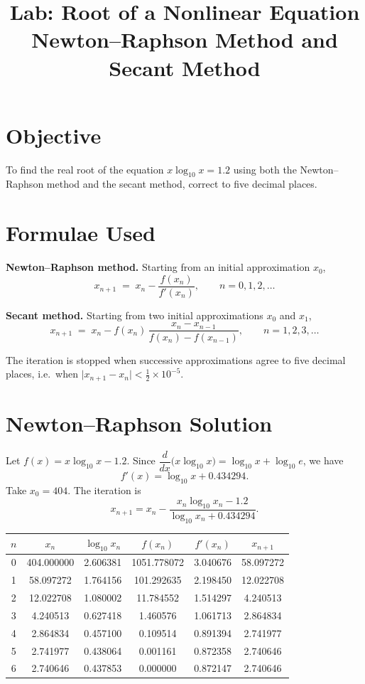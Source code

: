 \documentclass[11pt,a4paper]{article}
\title{\textbf{Lab: Root of a Nonlinear Equation}\\[4pt]
\large Newton--Raphson Method and Secant Method}
\author{}
\date{}
\begin{document}
\maketitle
\vspace{-3em}

\section*{Objective}
To find the real root of the equation $x\log_{10}x=1.2$ using both the
Newton--Raphson method and the secant method, correct to five decimal places.

\section*{Formulae Used}

\textbf{Newton--Raphson method.} Starting from an initial approximation $x_{0}$,
\begin{equation*}
x_{n+1} \;=\; x_{n}-\frac{f(x_{n})}{f'(x_{n})}, \qquad n=0,1,2,\ldots
\end{equation*}

\textbf{Secant method.} Starting from two initial approximations $x_{0}$ and $x_{1}$,
\begin{equation*}
x_{n+1} \;=\; x_{n}-f(x_{n})\,\frac{x_{n}-x_{n-1}}{f(x_{n})-f(x_{n-1})},
\qquad n=1,2,3,\ldots
\end{equation*}

The iteration is stopped when successive approximations agree to five decimal
places, i.e.\ when $\lvert x_{n+1}-x_{n}\rvert<\tfrac{1}{2}\times10^{-5}$.

\section*{Newton--Raphson Solution}
Let $f(x)=x\log_{10}x-1.2$. Since
$\dfrac{d}{dx}\bigl(x\log_{10}x\bigr)=\log_{10}x+\log_{10}e$, we have
\[
f'(x)=\log_{10}x+0.434294 .
\]
Take $x_{0}=404$. The iteration is
\[
x_{n+1}=x_{n}-\frac{x_{n}\log_{10}x_{n}-1.2}{\log_{10}x_{n}+0.434294}.
\]

\begin{center}
\begin{tabular}{cccccc}
\toprule
$n$ & $x_{n}$ & $\log_{10}x_{n}$ & $f(x_{n})$ & $f'(x_{n})$ & $x_{n+1}$ \\
\midrule
0 & 404.000000 & 2.606381 & 1051.778072 & 3.040676 & 58.097272 \\
1 & 58.097272  & 1.764156 & 101.292635  & 2.198450 & 12.022708 \\
2 & 12.022708  & 1.080002 & 11.784552   & 1.514297 & 4.240513 \\
3 & 4.240513   & 0.627418 & 1.460576    & 1.061713 & 2.864834 \\
4 & 2.864834   & 0.457100 & 0.109514    & 0.891394 & 2.741977 \\
5 & 2.741977   & 0.438064 & 0.001161    & 0.872358 & 2.740646 \\
6 & 2.740646   & 0.437853 & 0.000000    & 0.872147 & 2.740646 \\
\bottomrule
\end{tabular}
\end{center}
\end{document}
